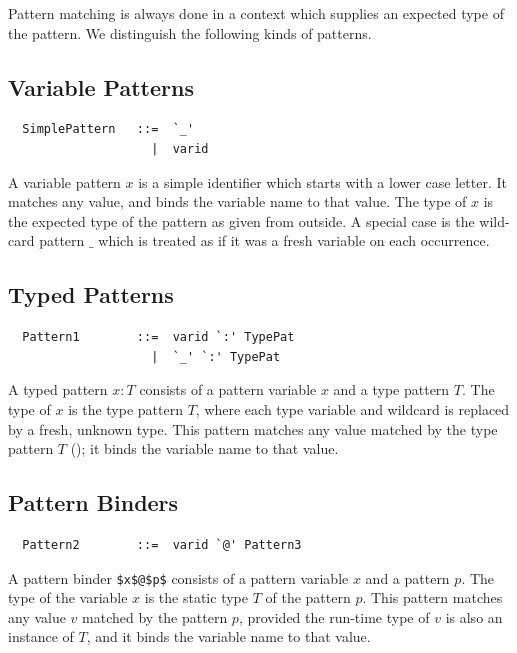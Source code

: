 Pattern matching is always done in a context which supplies an
expected type of the pattern. We distinguish the following kinds of
patterns.

\subsection{Variable Patterns}

\syntax\begin{lstlisting}
  SimplePattern   ::=  `_'
                    |  varid
\end{lstlisting}

A variable pattern $x$ is a simple identifier which starts with a
lower case letter.  It matches any value, and binds the variable name
to that value.  The type of $x$ is the expected type of the pattern as
given from outside.  A special case is the wild-card pattern $\_$
which is treated as if it was a fresh variable on each occurrence.

\subsection{Typed Patterns}
\label{sec:typed-patterns}
\syntax
\begin{lstlisting}
  Pattern1        ::=  varid `:' TypePat
                    |  `_' `:' TypePat
\end{lstlisting}

A typed pattern $x: T$ consists of a pattern variable $x$ and a
type pattern $T$.  The type of $x$ is the type pattern $T$, where 
each type variable and wildcard is replaced by a fresh, unknown type.
This pattern matches any value matched by the type
pattern $T$ (); it binds the variable name to
that value.  

\subsection{Pattern Binders}
\label{sec:pattern-binders}
\syntax
\begin{lstlisting}
  Pattern2        ::=  varid `@' Pattern3
\end{lstlisting}
A pattern binder \lstinline|$x$@$p$| consists of a pattern variable $x$ and a 
pattern $p$. The type of the variable $x$ is the static type $T$ of the pattern $p$.
This pattern matches any value $v$ matched by the pattern $p$, 
provided the run-time type of $v$ is also an instance of $T$, 
and it binds the variable name to that value.

